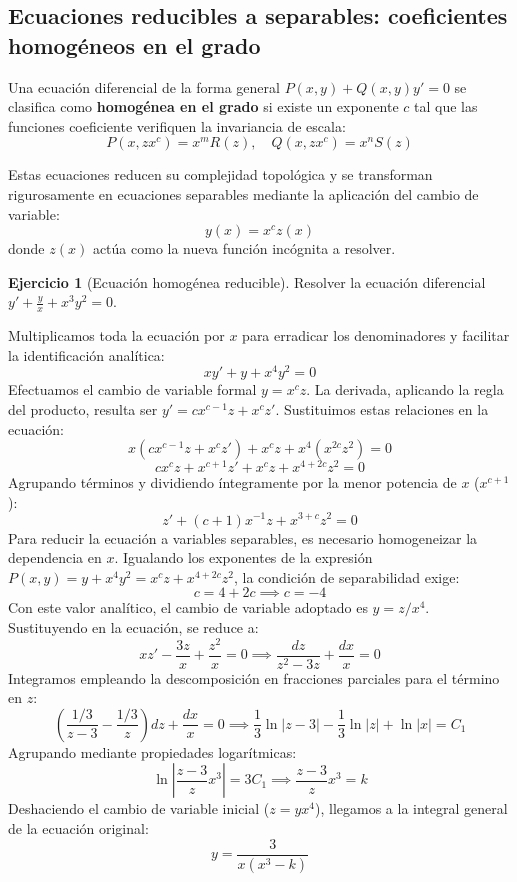 \documentclass[11pt,a4paper]{article}
\theoremstyle{definition}
\newtheorem{exercise}{Ejercicio}[section]
\theoremstyle{plain}
\begin{document}
\subsection{Ecuaciones reducibles a separables: coeficientes homogéneos en el grado}

Una ecuación diferencial de la forma general $P(x,y) + Q(x,y)y' = 0$ se clasifica como \textbf{homogénea en el grado} si existe un exponente $c$ tal que las funciones coeficiente verifiquen la invariancia de escala:
$$ P(x, zx^c) = x^m R(z), \quad Q(x, zx^c) = x^n S(z) $$

Estas ecuaciones reducen su complejidad topológica y se transforman rigurosamente en ecuaciones separables mediante la aplicación del cambio de variable:
$$ y(x) = x^c z(x) $$
donde $z(x)$ actúa como la nueva función incógnita a resolver.

\begin{exercise}[Ecuación homogénea reducible]
Resolver la ecuación diferencial $y' + \frac{y}{x} + x^3y^2 = 0$.
\end{exercise}

\begin{tcolorbox}
Multiplicamos toda la ecuación por $x$ para erradicar los denominadores y facilitar la identificación analítica:
$$ xy' + y + x^4y^2 = 0 $$
Efectuamos el cambio de variable formal $y = x^c z$. La derivada, aplicando la regla del producto, resulta ser $y' = c x^{c-1} z + x^c z'$. Sustituimos estas relaciones en la ecuación:
$$ x(c x^{c-1} z + x^c z') + x^c z + x^4 (x^{2c} z^2) = 0 $$
$$ c x^c z + x^{c+1} z' + x^c z + x^{4+2c} z^2 = 0 $$
Agrupando términos y dividiendo íntegramente por la menor potencia de $x$ ($x^{c+1}$):
$$ z' + (c+1)x^{-1}z + x^{3+c}z^2 = 0 $$
Para reducir la ecuación a variables separables, es necesario homogeneizar la dependencia en $x$. Igualando los exponentes de la expresión $P(x,y) = y + x^4y^2 = x^cz + x^{4+2c}z^2$, la condición de separabilidad exige:
$$ c = 4 + 2c \implies c = -4 $$
Con este valor analítico, el cambio de variable adoptado es $y = z/x^4$. Sustituyendo en la ecuación, se reduce a:
$$ xz' - \frac{3z}{x} + \frac{z^2}{x} = 0 \implies \frac{dz}{z^2 - 3z} + \frac{dx}{x} = 0 $$
Integramos empleando la descomposición en fracciones parciales para el término en $z$:
$$ \left( \frac{1/3}{z-3} - \frac{1/3}{z} \right)dz + \frac{dx}{x} = 0 \implies \frac{1}{3}\ln|z-3| - \frac{1}{3}\ln|z| + \ln|x| = C_1 $$
Agrupando mediante propiedades logarítmicas:
$$ \ln\left| \frac{z-3}{z} x^3 \right| = 3C_1 \implies \frac{z-3}{z} x^3 = k $$
Deshaciendo el cambio de variable inicial ($z = yx^4$), llegamos a la integral general de la ecuación original:
$$ y = \frac{3}{x(x^3 - k)} $$
\end{tcolorbox}
\newpage
\end{document}
